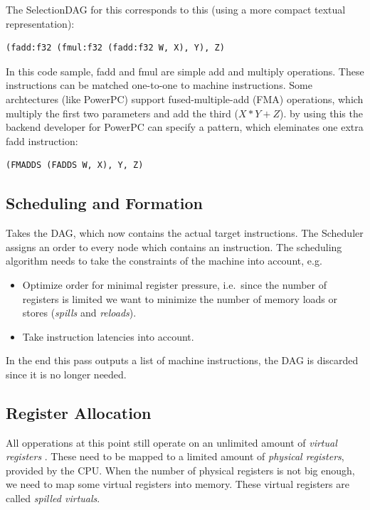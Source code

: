 
The SelectionDAG for this corresponds to this (using a more compact textual representation):
\begin{lstlisting}
(fadd:f32 (fmul:f32 (fadd:f32 W, X), Y), Z)
\end{lstlisting}
In this code sample, fadd and fmul are simple add and multiply operations. These instructions can be matched
one-to-one to machine instructions. Some archtectures (like PowerPC) support fused-multiple-add (FMA) operations, which 
multiply the first two parameters and add the third ($X * Y + Z$).
by using this the backend developer for PowerPC can specify a pattern, which eleminates one extra fadd instruction:
\begin{lstlisting}
(FMADDS (FADDS W, X), Y, Z)
\end{lstlisting}


\subsection{Scheduling and Formation}

Takes the DAG, which now contains the actual target instructions.
The Scheduler assigns an order to every node which contains an instruction. The scheduling algorithm needs to take 
the constraints of the machine into account, e.g.\:
\begin{itemize}
  \item Optimize order for minimal register pressure, i.e.\ since the number of registers is limited we want 
        to minimize the number of memory loads or stores (\textit{spills} and \textit{reloads}).
  \item Take instruction latencies into account.
\end{itemize}
In the end this pass outputs a list of machine instructions, the DAG is discarded since it is no longer needed.

\subsection{Register Allocation}

All opperations at this point still operate on an unlimited amount of \textit{virtual registers} . 
These need to be mapped to a limited amount of \textit{physical registers}, provided by the CPU.
When the number of physical registers is not big enough, we need to map some 
virtual registers into memory. These virtual registers are called \textit{spilled virtuals}.

